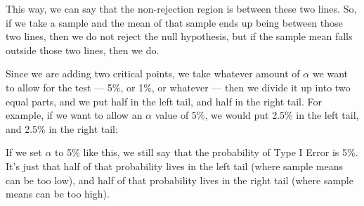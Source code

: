 \documentclass[../../../main.tex]{subfiles}
\begin{document}
\noindent
This way, we can say that the non-rejection region is between these two lines. So, if we take a sample and the mean of that sample ends up being between those two lines, then we do not reject the null hypothesis, but if the sample mean falls outside those two lines, then we do.

Since we are adding two critical points, we take whatever amount of $\alpha$ we want to allow for the test --- 5\%, or 1\%, or whatever --- then we divide it up into two equal parts, and we put half in the left tail, and half in the right tail. For example, if we want to allow an $\alpha$ value of 5\%, we would put 2.5\% in the left tail, and 2.5\% in the right tail:

\begin{center}
\end{center}

\noindent
If we set $\alpha$ to 5\% like this, we still say that the probability of Type I Error is 5\%. It's just that half of that probability lives in the left tail (where sample means can be too low), and half of that probability lives in the right tail (where sample means can be too high).
\end{document}

